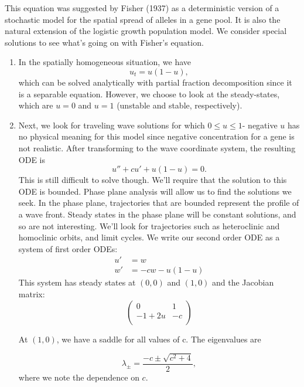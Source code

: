 \documentclass[]{article}
\numberwithin{equation}{section}		%
\begin{document}
This equation was suggested by Fisher (1937) as a deterministic version of a stochastic model for the spatial spread of alleles in a gene pool. It is also the natural extension of the logistic growth population model. We consider special solutions to see what's going on with Fisher's equation. 

\begin{enumerate}
\item In the spatially homogeneous situation, we have \begin{equation*}
u_t = u(1-u),
\end{equation*} which can be solved analytically with partial fraction decomposition since it is a separable equation. However, we choose to look at the steady-states, which are $u = 0$ and $u = 1$ (unstable and stable, respectively). 

\item Next, we look for traveling wave solutions for which $ 0\leq u \leq 1$- negative $u$ has no physical meaning for this model since negative concentration for a gene is not realistic. After transforming to the wave coordinate system, the resulting ODE is 
\begin{equation*}
u''+cu'+u(1-u)=0.
\end{equation*} This is still difficult to solve though. We'll require that the solution to this ODE is bounded. Phase plane analysis will allow us to find the solutions we seek. In the phase plane, trajectories that are bounded represent the profile of a wave front. Steady states in the phase plane will be constant solutions, and so are not interesting. We'll look for trajectories such as heteroclinic and homoclinic orbits, and limit cycles. We write our second order ODE as a system of first order ODEs:
\begin{align}
    u'&=w\\
    w'&=-cw-u(1-u)
\end{align}
This system has steady states at $(0,0)$ and $(1,0)$ and the Jacobian
matrix:
\begin{equation*}
\begin{pmatrix}
  0 & 1 \\
  -1+2u & -c \\
\end{pmatrix}
\end{equation*}

At $(1,0)$, we have a saddle for all values of c. The eigenvalues are

\begin{equation*}
\lambda_{\pm}=\frac{-c\pm \sqrt{c^2+4}}{2}, \end{equation*} where we note the dependence on $c$.


\end{enumerate}
\end{document}
